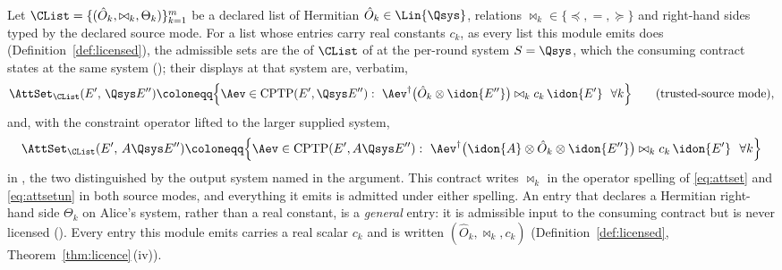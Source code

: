 \begin{definition}
\label{def:attset}
Let $\CList=\{(\hat O_k,\bowtie_k,\Theta_k)\}_{k=1}^{m}$ be a declared list of
Hermitian $\hat O_k\in\Lin{\Qsys}$, relations
$\bowtie_k\in\{\preceq,=,\succeq\}$ and right-hand sides typed by the declared
source mode. For a list whose entries carry real constants $c_k$, as every
list this module emits does (Definition~\ref{def:licensed}), the admissible
sets are the  of $\CList$ of
 at the per-round system $S=\Qsys$, which the
consuming contract states at the same system
(); their displays at that system are,
verbatim,
\begin{equation}\label{eq:attset}
  \AttSet_{\CList}(E',\,\Qsys E'')\coloneqq
  \Big\{\Aev\in\mathrm{CPTP}(E',\Qsys E''):\
  \Aev^{\dagger}\big(\hat O_k\otimes\idon{E''}\big)
  \bowtie_k c_k\,\idon{E'}\ \ \forall k\Big\}
  \qquad\text{(trusted-source mode)},
\end{equation}
and, with the constraint operator lifted to the larger supplied system,
\begin{equation}\label{eq:attsetun}
  \AttSet_{\CList}(E',\,A\Qsys E'')\coloneqq
  \Big\{\Aev\in\mathrm{CPTP}(E',A\Qsys E''):\
  \Aev^{\dagger}\big(\idon{A}\otimes\hat O_k\otimes\idon{E''}\big)
  \bowtie_k c_k\,\idon{E'}\ \ \forall k\Big\}
\end{equation}
in , the two distinguished by the output system
named in the argument. This contract writes $\bowtie_k$ in the operator
spelling of \eqref{eq:attset} and \eqref{eq:attsetun} in both source modes,
and everything it emits is admitted under either spelling. An entry that declares a Hermitian
right-hand side $\Theta_k$ on Alice's system, rather than a real constant, is
a \emph{general} entry: it is admissible input to the consuming contract but
is never licensed (\xref{protocol-compiler/def:homog}). Every entry this module emits
carries a real scalar $c_k$ and is written $(\hat O_k,\bowtie_k,c_k)$
(Definition~\ref{def:licensed}, Theorem~\ref{thm:licence}\,(iv)).


\end{definition}
